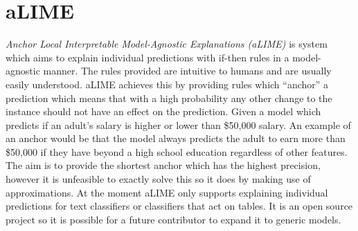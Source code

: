 \section{aLIME}
\emph{Anchor Local Interpretable Model-Agnostic Explanations (aLIME)} \cite{ribeiro2016nothing} is system which aims to explain individual predictions with if-then rules in a model-agnostic manner. The rules provided are intuitive to humans and are usually easily understood. aLIME achieves this by providing rules which ``anchor'' a prediction which means that with a high probability any other change to the instance should not have an effect on the prediction. Given a model which predicts if an adult's salary is higher or lower than \$50,000 salary. An example of an anchor would be that the model always predicts the adult to earn more than \$50,000 if they have beyond a high school education regardless of other features.  The aim is to provide the shortest anchor which has the highest precision, however it is unfeasible to exactly solve this so it does by making use of approximations. At the moment aLIME only supports explaining individual predictions for text classifiers or classifiers that act on tables. It is an open source project so it is possible for a future contributor to expand it to generic models.